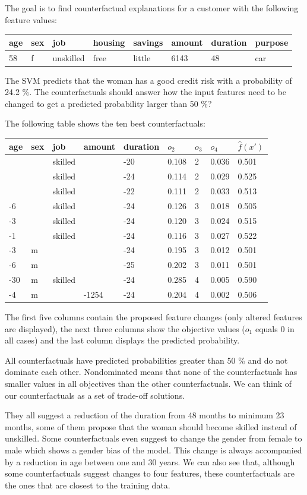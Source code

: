 \documentclass[
  11pt,
]{scrbook}
\begin{document}
The goal is to find counterfactual explanations for a customer with the following feature values:

\begin{longtable}[]{@{}llllllll@{}}
\toprule
age & sex & job & housing & savings & amount & duration & purpose\tabularnewline
\midrule
\endhead
58 & f & unskilled & free & little & 6143 & 48 & car\tabularnewline
\bottomrule
\end{longtable}

The SVM predicts that the woman has a good credit risk with a probability of 24.2 \%.
The counterfactuals should answer how the input features need to be changed to get a predicted probability larger than 50 \%?

The following table shows the ten best counterfactuals:

\begin{longtable}[]{@{}lllllllll@{}}
\toprule
age & sex & job & amount & duration & \(o_2\) & \(o_3\) & \(o_4\) & \(\hat{f}(x')\)\tabularnewline
\midrule
\endhead
& & skilled & & -20 & 0.108 & 2 & 0.036 & 0.501\tabularnewline
& & skilled & & -24 & 0.114 & 2 & 0.029 & 0.525\tabularnewline
& & skilled & & -22 & 0.111 & 2 & 0.033 & 0.513\tabularnewline
-6 & & skilled & & -24 & 0.126 & 3 & 0.018 & 0.505\tabularnewline
-3 & & skilled & & -24 & 0.120 & 3 & 0.024 & 0.515\tabularnewline
-1 & & skilled & & -24 & 0.116 & 3 & 0.027 & 0.522\tabularnewline
-3 & m & & & -24 & 0.195 & 3 & 0.012 & 0.501\tabularnewline
-6 & m & & & -25 & 0.202 & 3 & 0.011 & 0.501\tabularnewline
-30 & m & skilled & & -24 & 0.285 & 4 & 0.005 & 0.590\tabularnewline
-4 & m & & -1254 & -24 & 0.204 & 4 & 0.002 & 0.506\tabularnewline
\bottomrule
\end{longtable}

The first five columns contain the proposed feature changes (only altered features are displayed), the next three columns show the objective values (\(o_1\) equals 0 in all cases) and the last column displays the predicted probability.

All counterfactuals have predicted probabilities greater than 50 \% and do not dominate each other.
Nondominated means that none of the counterfactuals has smaller values in all objectives than the other counterfactuals.
We can think of our counterfactuals as a set of trade-off solutions.

They all suggest a reduction of the duration from 48 months to minimum 23 months, some of them propose that the woman should become skilled instead of unskilled.
Some counterfactuals even suggest to change the gender from female to male which shows a gender bias of the model.
This change is always accompanied by a reduction in age between one and 30 years.
We can also see that, although some counterfactuals suggest changes to four features, these counterfactuals are the ones that are closest to the training data.
\end{document}
